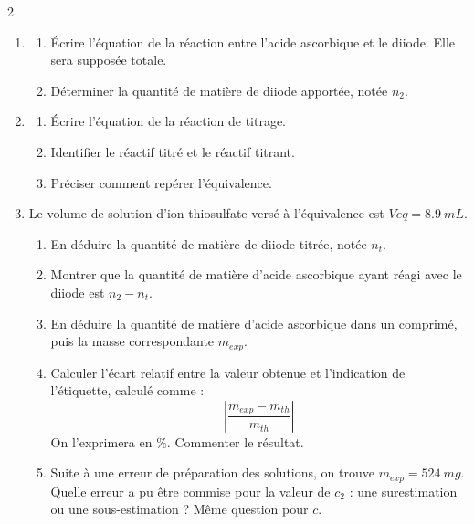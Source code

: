\documentclass[a4paper,10pt,fleqn]{scrartcl}%
\begin{document}
\begin{multicols}{2}
\begin{enumerate}
    \item \begin{enumerate}
        \item Écrire l'équation de la réaction entre l'acide ascorbique et le diiode. Elle sera supposée totale.
        \item Déterminer la quantité de matière de diiode apportée, notée $n_2$.
    \end{enumerate}
    \item \begin{enumerate}
        \item Écrire l'équation de la réaction de titrage.
        \item Identifier le réactif titré et le réactif titrant.
        \item Préciser comment repérer l'équivalence.
    \end{enumerate}
    \item Le volume de solution d'ion thiosulfate versé à l'équivalence est $V{eq} = \SI{8,9}{mL}$. \begin{enumerate}
        \item En déduire la quantité de matière de diiode titrée, notée $n_t$.
        \item Montrer que la quantité de matière d'acide ascorbique ayant réagi avec le diiode est $n_2-n_t$.
        \item En déduire la quantité de matière d'acide ascorbique dans un comprimé, puis la masse correspondante $m_{exp}$.
        \item Calculer l'écart relatif entre la valeur obtenue et l'indication de l'étiquette, calculé comme : $$ \left|\dfrac{m_{exp}-m_{th}}{m_{th}}\right|$$
        On l'exprimera en \unit{\percent}. Commenter le résultat.
        \item Suite à une erreur de préparation des solutions, on trouve $m_{exp} = \SI{524}{mg}$. Quelle erreur a pu être commise pour la valeur de $c_2$ : une surestimation ou une sous-estimation ? Même question pour $c$.
    \end{enumerate}
\end{enumerate}
\end{multicols}
\end{document}

